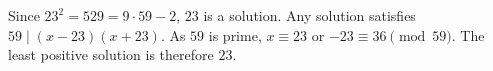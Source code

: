 Since $23^2=529=9\cdot59-2$, $23$ is a solution. Any solution satisfies $59\mid(x-23)(x+23)$. As $59$ is prime, $x\equiv23$ or $-23\equiv36\pmod{59}$. The least positive solution is therefore $\boxed{23}$.
